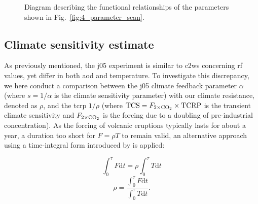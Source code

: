 \documentclass{ametsocV6.1}
\begin{document}
\begin{figure}
  \centering


  \caption{Diagram describing the functional relationships of the parameters shown in
    Fig.~\ref{fig:4_parameter_scan}.}\label{fig:5_diagram_of_function_relations}%
\end{figure}

\subsection{Climate sensitivity estimate}

As previously mentioned, the \gls{j05} experiment is similar to \gls{c2ws} concerning
\gls{rf} values, yet differ in both \gls{aod} and temperature. To investigate this
discrepancy, we here conduct a comparison between the \gls{j05} climate feedback
parameter \(\alpha\) (where \(s=1/\alpha\) is the climate sensitivity parameter) with
our climate resistance, denoted as \(\rho\), and the \gls{tcrp} \(1/\rho\) (where
\(\mathrm{TCS}=F_{2\times\ce{CO2}}\times \mathrm{TCRP}\) is the transient climate
sensitivity and \(F_{2\times\ce{CO2}}\) is the forcing due to a doubling of
pre-industrial  concentration). As the forcing of volcanic eruptions typically
lasts for about a year, a duration too short for \(F=\rho T\) to remain valid, an
alternative approach using a time-integral form introduced by \citet{merlis2014} is
applied:

\begin{equation}
  \int_0^{\tau}F \mathrm{d}t=\rho\int_{0}^{\tau}T \mathrm{d}t
  \label{eq:climate-resistance-orig}
\end{equation}
\begin{equation}
  \rho=\frac{\int_0^{\tau}F \mathrm{d}t}{\int_{0}^{\tau}T \mathrm{d}t}.
  \label{eq:climate-resistance}
\end{equation}
\end{document}
